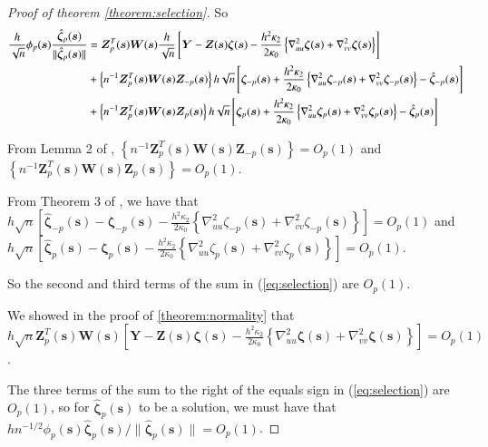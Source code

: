 \documentclass[authoryear, review, 11pt]{elsarticle}
\begin{document}
\begin{proof}[Proof of theorem \ref{theorem:selection}]
            So
            \begin{align}\label{eq:selection}
                \frac{h}{\sqrt{n}} \phi_p(\bm{s}) \frac{ \hat{\bm{\zeta}}_p(\bm{s}) }{\| \hat{\bm{\zeta}}_p(\bm{s}) \|} &= \bm{Z}_p^T(\bm{s}) \bm{W}(\bm{s}) \frac{h}{\sqrt{n}} \left[ \bm{Y} - \bm{Z}(\bm{s}) \bm{\zeta}(\bm{s}) - \frac{h^2 \kappa_2}{2 \kappa_0} \left\{ \nabla^2_{uu} \bm{\zeta}(\bm{s}) + \nabla^2_{vv} \bm{\zeta}(\bm{s}) \right\} \right] \notag \\ 
                &+ \left\{ n^{-1}  \bm{Z}_p^T(\bm{s}) \bm{W}(\bm{s}) \bm{Z}_{-p}(\bm{s}) \right\} h \sqrt{n} \left[ \bm{\zeta}_{-p}(\bm{s}) + \frac{h^2 \kappa_2}{2 \kappa_0} \left\{ \nabla^2_{uu} \bm{\zeta}_{-p}(\bm{s}) + \nabla^2_{vv} \bm{\zeta}_{-p}(\bm{s}) \right\} - \hat{\bm{\zeta}}_{-p}(\bm{s}) \right] \notag \\
                &+ \left\{ n^{-1} \bm{Z}_p^T(\bm{s}) \bm{W}(\bm{s}) \bm{Z}_p(\bm{s}) \right\} h \sqrt{n} \left[ \bm{\zeta}_p(\bm{s}) + \frac{h^2 \kappa_2}{2 \kappa_0} \left\{ \nabla^2_{uu} \bm{\zeta}_p(\bm{s}) + \nabla^2_{vv} \bm{\zeta}_p(\bm{s}) \right\} - \hat{\bm{\zeta}}_p(\bm{s}) \right]
            \end{align}

            From Lemma 2 of \cite{Sun-Yan-Zhang-Lu-2014}, $\left\{ n^{-1} \bm{Z}_p^T(\bm{s}) \bm{W}(\bm{s}) \bm{Z}_{-p}(\bm{s}) \right\} = O_p(1)$ and $\left\{ n^{-1} \bm{Z}_p^T(\bm{s}) \bm{W}(\bm{s}) \bm{Z}_p(\bm{s}) \right\} = O_p(1)$.
        
            From Theorem 3 of \cite{Sun-Yan-Zhang-Lu-2014}, we have that $h \sqrt{n} \left[ \hat{\bm{\zeta}}_{-p} (\bm{s}) - \bm{\zeta}_{-p}(\bm{s}) - \frac{h^2 \kappa_2}{2 \kappa_0} \left\{ \nabla^2_{uu} \zeta_{-p}(\bm{s}) + \nabla^2_{vv} \zeta_{-p}(\bm{s}) \right\}\right] = O_p(1)$ and $h \sqrt{n} \left[ \hat{\bm{\zeta}}_p(\bm{s}) - \bm{\zeta}_p(\bm{s}) - \frac{h^2 \kappa_2}{2 \kappa_0} \left\{ \nabla^2_{uu} \zeta_p(\bm{s}) + \nabla^2_{vv} \zeta_p(\bm{s}) \right\} \right] = O_p(1)$.
        
            So the second and third terms of the sum in (\ref{eq:selection}) are $O_p(1)$.
        
            We showed in the proof of \ref{theorem:normality} that $h  \sqrt{n} \bm{Z}_p^T(\bm{s}) \bm{W}(\bm{s}) \left[ \bm{Y} - \bm{Z}(\bm{s}) \bm{\zeta}(\bm{s}) - \frac{h^2 \kappa_2}{2 \kappa_0} \left\{ \nabla^2_{uu} \bm{\zeta}(\bm{s}) + \nabla^2_{vv} \bm{\zeta}(\bm{s}) \right\} \right]= O_p(1)$.

            The three terms of the sum to the right of the equals sign in (\ref{eq:selection}) are $O_p(1)$, so for $\hat{\bm{\zeta}}_p (\bm{s})$ to be a solution, we must have that $h n^{-1/2} \phi_p(\bm{s}) \hat{\bm{\zeta}}_p (\bm{s}) / \| \hat{\bm{\zeta}}_p (\bm{s}) \| = O_p(1)$.


\end{proof}
\end{document}
